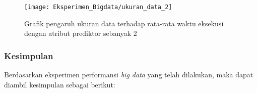 \begin{figure}[H]
	\centering
	\texttt{[image: Eksperimen\_Bigdata/ukuran\_data\_2]}
	\caption[Grafik pengaruh ukuran data terhadap rata-rata waktu eksekusi dengan atribut prediktor sebanyak 2]{Grafik pengaruh ukuran data terhadap rata-rata waktu eksekusi dengan atribut prediktor sebanyak 2}
	\label{fig:Grafik pengaruh ukuran data terhadap rata-rata waktu eksekusi atr 2}
\end{figure}

\subsubsection{Kesimpulan}
Berdasarkan eksperimen performansi \textit{big data} yang telah dilakukan, maka dapat diambil kesimpulan sebagai berikut:

